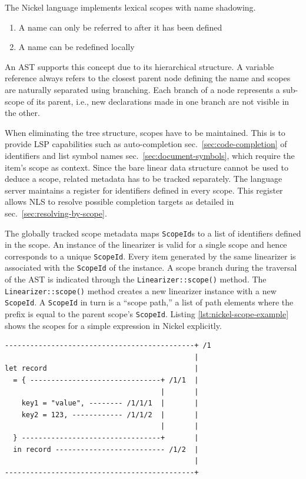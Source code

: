 \documentclass[
  a4paper,
  bibtex,
  english,
  nomenclature]{kthlatex/kththesis/kththesis}
\providecommand{\tightlist}{%
  \setlength{\itemsep}{0pt}\setlength{\parskip}{0pt}}
\begin{document}
The Nickel language implements lexical scopes with name shadowing.

\begin{enumerate}
\def\labelenumi{\arabic{enumi}.}
\tightlist
\item
  A name can only be referred to after it has been defined
\item
  A name can be redefined locally
\end{enumerate}

An AST supports this concept due to its hierarchical structure. A
variable reference always refers to the closest parent node defining the
name and scopes are naturally separated using branching. Each branch of
a node represents a sub-scope of its parent, i.e., new declarations made
in one branch are not visible in the other.

When eliminating the tree structure, scopes have to be maintained. This
is to provide LSP capabilities such as auto-completion
sec.~\ref{sec:code-completion} of identifiers and list symbol names
sec.~\ref{sec:document-symbols}, which require the item's scope as
context. Since the bare linear data structure cannot be used to deduce a
scope, related metadata has to be tracked separately. The language
server maintains a register for identifiers defined in every scope. This
register allows NLS to resolve possible completion targets as detailed
in sec.~\ref{sec:resolving-by-scope}.

The globally tracked scope metadata maps \texttt{ScopeId}s to a list of
identifiers defined in the scope. An instance of the linearizer is valid
for a single scope and hence corresponds to a unique \texttt{ScopeId}.
Every item generated by the same linearizer is associated with the
\texttt{ScopeId} of the instance. A scope branch during the traversal of
the AST is indicated through the \texttt{Linearizer::scope()} method.
The \texttt{Linearizer::scope()} method creates a new linearizer
instance with a new \texttt{ScopeId}. A \texttt{ScopeId} in turn is a
``scope path,'' a list of path elements where the prefix is equal to the
parent scope's \texttt{ScopeId}. Listing \ref{lst:nickel-scope-example}
shows the scopes for a simple expression in Nickel explicitly.

\begin{codelisting}

\caption{Explicit display of Nickel scopes}

\hypertarget{lst:nickel-scope-example}{%
\label{lst:nickel-scope-example}}%
\begin{verbatim}
---------------------------------------------+ /1
                                             |
let record                                   |
  = { -------------------------------+ /1/1  |
                                     |       |
    key1 = "value", -------- /1/1/1  |       |
    key2 = 123, ------------ /1/1/2  |       |
                                     |       |
  } ---------------------------------+       |
  in record -------------------------- /1/2  |
                                             |
---------------------------------------------+
\end{verbatim}

\end{codelisting}
\end{document}
